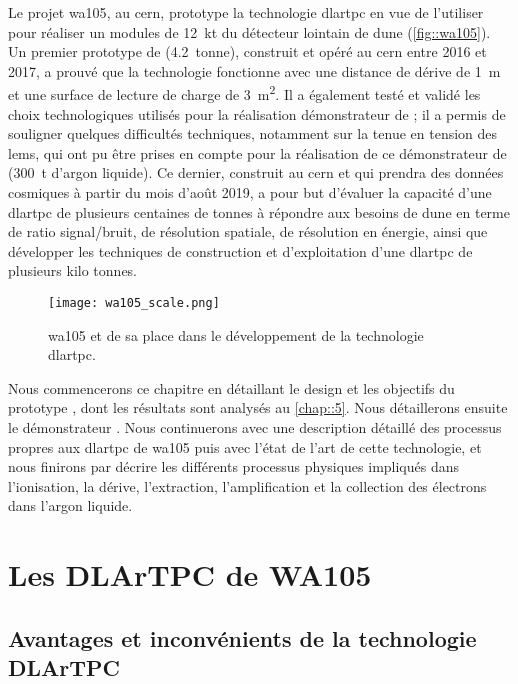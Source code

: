     Le projet \gls{wa105}, au \gls{cern}, prototype la technologie \gls{dlartpc} en vue de l'utiliser pour réaliser un modules de \SI{12}{\kilo\tonne} du détecteur lointain de \gls{dune} (\autoref{fig::wa105}). Un premier prototype de \TOO{} (\SI{4.2}{tonne}), construit et opéré au \gls{cern} entre 2016 et 2017, a prouvé que la technologie fonctionne avec une distance de dérive de \SI{1}{\meter} et une surface de lecture de charge de \SI{3}{\meter\squared}. Il a également testé et validé les choix technologiques utilisés pour la réalisation démonstrateur de \protodp{}; il a permis de souligner quelques difficultés techniques, notamment sur la tenue en tension des \glspl{lem}, qui ont pu être prises en compte pour la réalisation de ce démonstrateur de \SSS{} (\SI{300}{\tonne} d'argon liquide). Ce dernier, construit au \gls{cern} et qui prendra des données cosmiques à partir du mois d'août 2019, a pour but d'évaluer la capacité d'une \gls{dlartpc} de plusieurs centaines de tonnes à répondre aux besoins de \gls{dune} en terme de ratio signal/bruit, de résolution spatiale, de résolution en énergie, ainsi que développer les techniques de construction et d'exploitation d'une \gls{dlartpc} de plusieurs kilo tonnes.

    \begin{figure}[htbp]
      \centering
      \texttt{[image: wa105\_scale.png]}        
      \caption[Le projet WA105]{\label{fig::wa105}\gls{wa105} et de sa place dans le développement de la technologie \gls{dlartpc}.}
    \end{figure}

    Nous commencerons ce chapitre en détaillant le design et les objectifs du prototype \TOO{}, dont les résultats sont analysés au \autoref{chap::5}. Nous détaillerons ensuite le démonstrateur \SSS{}. Nous continuerons avec une description détaillé des processus propres aux \gls{dlartpc} de \gls{wa105} puis avec l'état de l'art de cette technologie, et nous finirons par décrire les différents processus physiques impliqués dans l'ionisation, la dérive, l'extraction, l'amplification et la collection des électrons dans l'argon liquide.

  \section{Les DLArTPC de WA105}

    \subsection{Avantages et inconvénients de la technologie DLArTPC}

